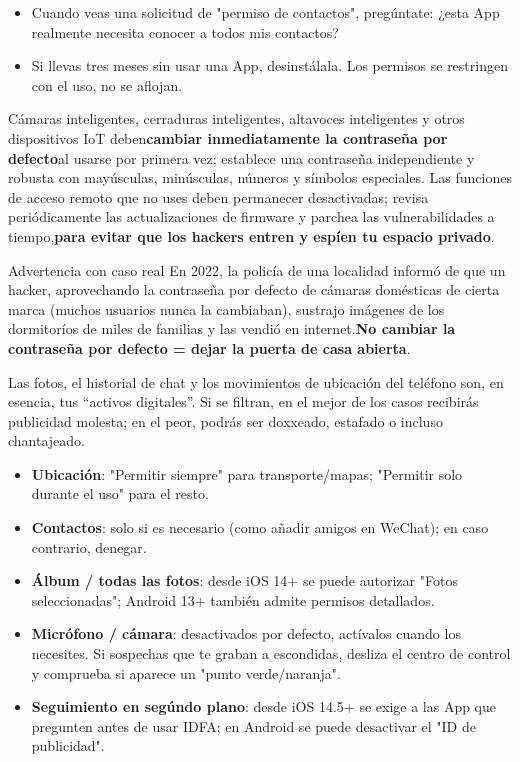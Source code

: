 \begin{itemize}
  \item Cuando veas una solicitud de "permiso de contactos", pregúntate: ¿esta App realmente necesita conocer a todos mis contactos?
  \item Si llevas tres meses sin usar una App, desinstálala. Los permisos se restringen con el uso, no se aflojan.
\end{itemize}


Cámaras inteligentes, cerraduras inteligentes, altavoces inteligentes y otros dispositivos IoT deben\textbf{cambiar inmediatamente la contraseña por defecto}al usarse por primera vez; establece una contraseña independiente y robusta con mayúsculas, minúsculas, números y símbolos especiales. Las funciones de acceso remoto que no uses deben permanecer desactivadas; revisa periódicamente las actualizaciones de firmware y parchea las vulnerabilidades a tiempo,\textbf{para evitar que los hackers entren y espíen tu espacio privado}.

\begin{tcbwarn}{Advertencia con caso real}
En 2022, la policía de una localidad informó de que un hacker, aprovechando la contraseña por defecto de cámaras domésticas de cierta marca (muchos usuarios nunca la cambiaban), sustrajo imágenes de los dormitoríos de miles de familias y las vendió en internet.\textbf{No cambiar la contraseña por defecto = dejar la puerta de casa abierta}.

\end{tcbwarn}


Las fotos, el historial de chat y los movimientos de ubicación del teléfono son, en esencia, tus “activos digitales”. Si se filtran, en el mejor de los casos recibirás publicidad molesta; en el peor, podrás ser doxxeado, estafado o incluso chantajeado.


\begin{itemize}
  \item \textbf{Ubicación}: "Permitir siempre" para transporte/mapas; "Permitir solo durante el uso" para el resto.
  \item \textbf{Contactos}: solo si es necesario (como añadir amigos en WeChat); en caso contrario, denegar.
  \item \textbf{Álbum / todas las fotos}: desde iOS 14+ se puede autorizar "Fotos seleccionadas"; Android 13+ también admite permisos detallados.
  \item \textbf{Micrófono / cámara}: desactivados por defecto, actívalos cuando los necesites. Si sospechas que te graban a escondidas, desliza el centro de control y comprueba si aparece un "punto verde/naranja".
  \item \textbf{Seguimiento en segúndo plano}: desde iOS 14.5+ se exige a las App que pregunten antes de usar IDFA; en Android se puede desactivar el "ID de publicidad".
\end{itemize}


